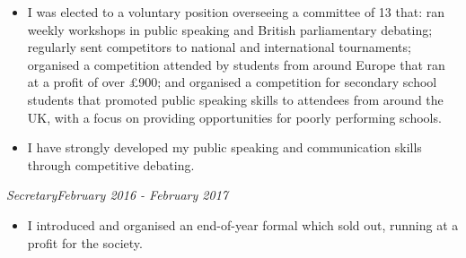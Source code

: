 \documentclass[11pt,a4paper,sans]{moderncv}        %
\begin{document}
\vspace{4pt}
\vspace{4pt}
\vspace{0pt}
{\small \begin{itemize}
\item I was elected to a voluntary position overseeing a committee of 13 that: ran weekly workshops in public speaking and British parliamentary debating; regularly sent competitors to national and international tournaments; organised a competition attended by students from around Europe that ran at a profit of over £900; and organised a competition for secondary school students that promoted public speaking skills to attendees from around the UK, with a focus on providing opportunities for poorly performing schools.
\item I have strongly developed my public speaking and communication skills through competitive debating.
\end{itemize}}
\vspace{4pt}
\textit{Secretary\hfill February 2016 - February 2017}
{\small \vspace{3pt} \begin{itemize}
\item  I introduced and organised an end-of-year formal which sold out, running at a profit for the society. 
\end{itemize}}
\end{document}
